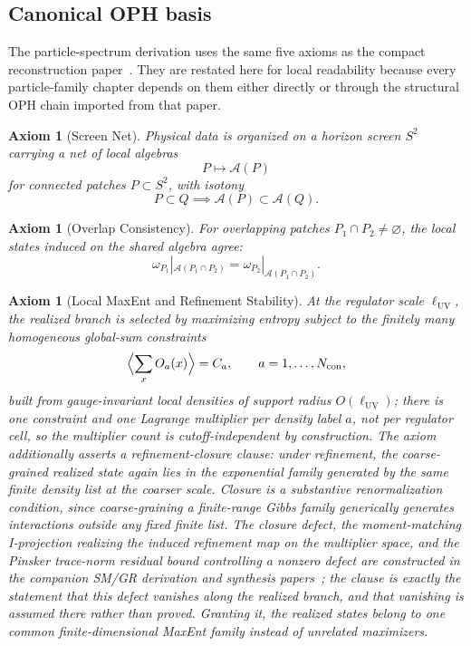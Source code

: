 \documentclass[11pt]{article}
\newtheorem{axiom}[theorem]{Axiom}
\begin{document}
\subsection{Canonical OPH basis}

The particle-spectrum derivation uses the same five axioms as the compact reconstruction
paper~\cite{ophcompact}. They are restated here for local readability because every
particle-family chapter depends on them either directly or through the structural OPH chain
imported from that paper.

\begin{axiom}[Screen Net]\label{ax:screen}
Physical data is organized on a horizon screen \(S^2\) carrying a net of local algebras
\[
P \longmapsto \mathcal A(P)
\]
for connected patches \(P\subset S^2\), with isotony
\[
P\subset Q \implies \mathcal A(P)\subset \mathcal A(Q).
\]
\end{axiom}

\begin{axiom}[Overlap Consistency]\label{ax:overlap}
For overlapping patches \(P_1\cap P_2\neq\varnothing\), the local states induced on the shared
algebra agree:
\[
\omega_{P_1}|_{\mathcal A(P_1\cap P_2)}
=
\omega_{P_2}|_{\mathcal A(P_1\cap P_2)}.
\]
\end{axiom}

\begin{axiom}[Local MaxEnt and Refinement Stability]\label{ax:maxent}
At the regulator scale \(\ell_{\mathrm{UV}}\), the realized branch is selected by maximizing
entropy subject to the finitely many homogeneous global-sum constraints
\[
\Bigl\langle\sum_x O_a(x)\Bigr\rangle=C_a,
\qquad a=1,\dots,N_{\mathrm{con}},
\]
built from gauge-invariant local densities of support radius \(O(\ell_{\mathrm{UV}})\); there is
one constraint and one Lagrange multiplier per density label \(a\), not per regulator cell, so the
multiplier count is cutoff-independent by construction. The axiom additionally asserts a
refinement-closure clause: under refinement, the coarse-grained realized state again lies in the
exponential family generated by the same finite density list at the coarser scale. Closure is a
substantive renormalization condition, since coarse-graining a finite-range Gibbs family
generically generates interactions outside any fixed finite list. The closure defect, the
moment-matching I-projection realizing the induced refinement map on the multiplier space, and
the Pinsker trace-norm residual bound controlling a nonzero defect are constructed in the
companion SM/GR derivation and synthesis papers~\cite{ophcompact,ophsynthesis}; the clause is
exactly the statement that this defect vanishes along the realized branch, and that vanishing is
assumed there rather than proved. Granting it, the realized
states belong to one common finite-dimensional MaxEnt family instead of unrelated maximizers.
\end{axiom}
\end{document}
